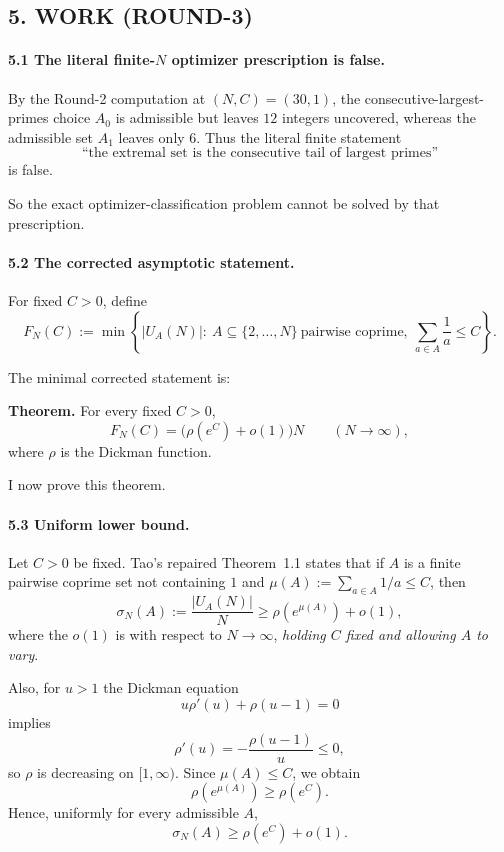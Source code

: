 \subsection*{5. WORK (ROUND-3)}

\paragraph{5.1 The literal finite-\(N\) optimizer prescription is false.}

By the Round-2 computation at \((N,C)=(30,1)\), the consecutive-largest-primes choice \(A_0\) is admissible but leaves \(12\) integers uncovered, whereas the admissible set \(A_1\) leaves only \(6\).  Thus the literal finite statement
\[
\mbox{``the extremal set is the consecutive tail of largest primes''}
\]
is false.

So the exact optimizer-classification problem cannot be solved by that prescription.

\paragraph{5.2 The corrected asymptotic statement.}

For fixed \(C>0\), define
\[
F_N(C):=\min\left\{|U_A(N)|:\ A\subseteq\{2,\dots,N\}\ \mbox{pairwise coprime},\ \sum_{a\in A}\frac1a\le C\right\}.
\]

The minimal corrected statement is:

\medskip

\noindent\textbf{Theorem.}
For every fixed \(C>0\),
\[
F_N(C)=\bigl(\rho(e^C)+o(1)\bigr)N
\qquad (N\to\infty),
\]
where \(\rho\) is the Dickman function.

\medskip

I now prove this theorem.

\paragraph{5.3 Uniform lower bound.}

Let \(C>0\) be fixed.  Tao's repaired Theorem~1.1 states that if \(A\) is a finite pairwise coprime set not containing \(1\) and \(\mu(A):=\sum_{a\in A}1/a\le C\), then
\[
\sigma_N(A):=\frac{|U_A(N)|}{N}\ge \rho(e^{\mu(A)})+o(1),
\]
where the \(o(1)\) is with respect to \(N\to\infty\), \emph{holding \(C\) fixed and allowing \(A\) to vary}.

Also, for \(u>1\) the Dickman equation
\[
u\rho'(u)+\rho(u-1)=0
\]
implies
\[
\rho'(u)=-\frac{\rho(u-1)}{u}\le 0,
\]
so \(\rho\) is decreasing on \([1,\infty)\).  Since \(\mu(A)\le C\), we obtain
\[
\rho(e^{\mu(A)})\ge \rho(e^C).
\]
Hence, uniformly for every admissible \(A\),
\[
\sigma_N(A)\ge \rho(e^C)+o(1).
\]

